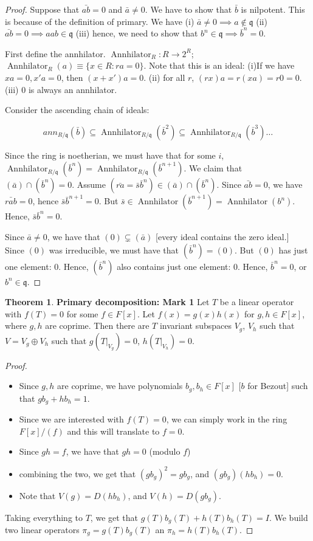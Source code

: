 \documentclass{book}
\newcommand{\q}{\mathfrak{q}}
\newcommand{\ann}{\operatorname{Annhilator}} %
\theoremstyle{definition}
\newtheorem{theorem}{Theorem}
\begin{document}
\begin{proof}
Suppose that $\bar{ab} = 0$ and $\bar{a} \neq 0$. We have to show that $\bar{b}$ is nilpotent.
This is because of the definition of primary. 
We have (i) $\bar{a} \neq 0 \implies a \not \in \q$ (ii) $\bar{ab} = 0 \implies a ab \in \q$
(iii) hence, we need to show that $b^n \in \q \implies \bar{b}^n = 0$.

First define the annhilator. $\ann_R: R \rightarrow 2^R$; $\ann_R(a) \equiv \{ x \in R : ra = 0 \}$.
Note that this is an ideal: (i)If we have $xa = 0, x'a = 0$, then
$(x + x')a = 0$. (ii) for all $r$, $(rx) a = r(xa) = r0 = 0$.
(iii) $0$ is always an annhilator.

Consider the ascending chain of ideals:

$$
ann_{R/\q}(\bar b) \subseteq \ann_{R/\q}(\bar b^2) \subseteq \ann_{R/\q}(\bar b^3) \dots
$$

Since the ring is noetherian, we must have that for some $i$, 
$\ann_{R/\q}(\bar b^n) = \ann_{R/\q}(\bar b^{n+1})$. We claim that $(\bar a) \cap (\bar b^n) = 0$.
Assume $(\bar{ra} = \bar s \bar b^n) \in (\bar a) \cap (\bar b^n)$. Since $\bar{ab} = 0$, we have
$\bar{rab} = 0$, hence $\bar s \bar b^{n+1} = 0$. But $\bar s \in \ann(\bar b^{n+1}) = \ann(b^n)$. Hence,
$\bar s \bar b^n = 0$.

Since $\bar a \neq 0$, we have that $(0) \subsetneq (\bar a)$ [every ideal contains the zero ideal.]
Since $(0)$ was irreducible, we must have that $(\bar b^n) = (0)$. But
$(0)$ has just one element: $0$. Hence, $(\bar b^n)$ also contains
just one element: $0$. Hence, $\bar b^n = 0$, or $b^n \in \q$.
\end{proof}

\begin{theorem}\textbf{Primary decomposition: Mark 1}
Let $T$ be a linear operator with $f(T) = 0$ for some $f \in F[x]$.
Let $f(x) = g(x)h(x)$ for $g, h \in F[x]$, where $g, h$ are coprime.
Then there are $T$ invariant subspaces $V_g$, $V_h$ such that $V = V_g \oplus V_h$
such that $g(T|_{V_g}) = 0$, $h(T|_{V_h}) = 0$.
\end{theorem}
\begin{proof}
\begin{itemize}
\item Since $g, h$ are coprime, we have polynomials $b_g, b_h \in F[x]$ [$b$ for Bezout]
such that $g b_g + h b_h = 1$. 
\item Since we are interested with $f(T) = 0$, we can simply work in the ring
     $F[x]/(f)$ and this will translate to $f = 0$.
\item Since $gh = f$, we have that $gh = 0$ (modulo $f$)
\item combining the two, we get that $(g b_g)^2 = g b_g$, and $(g b_g) (h b_h) = 0$.
\item Note that $V(g) = D(h b_h)$, and $V(h) = D(g b_g)$.
\end{itemize}

Taking everything to $T$, we 
get that $g(T) b_g(T) + h(T) b_h(T) = I$. 
We build two linear operators
$\pi_g = g(T) b_g(T)$ an $\pi_h = h(T) b_h(T)$.
\end{proof}
\end{document}
